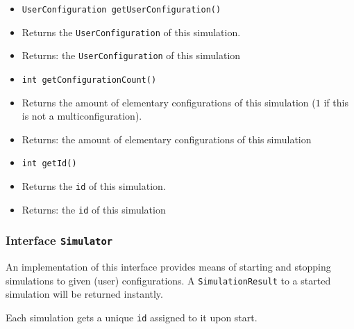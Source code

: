 \documentclass[parskip=full,11pt]{scrartcl}
\begin{document}
\begin{itemize}
	\item \texttt{UserConfiguration getUserConfiguration()}
	\item[] Returns the \texttt{UserConfiguration} of this simulation.
	\item[] Returns: the \texttt{UserConfiguration} of this simulation

	\item \texttt{int getConfigurationCount()}
	\item[] Returns the amount of elementary configurations of this simulation (\(1\) if this is not a multiconfiguration).
	\item[] Returns: the amount of elementary configurations of this simulation

	\item \texttt{int getId()}
	\item[] Returns the \texttt{id} of this simulation.
	\item[] Returns: the \texttt{id} of this simulation
\end{itemize}

\subsubsection{Interface \texttt{Simulator}}
An implementation of this interface provides means of starting and stopping simulations to given (user) configurations. A \texttt{SimulationResult} to a started simulation will be returned instantly.

Each simulation gets a unique \texttt{id} assigned to it upon start.
\end{document}
